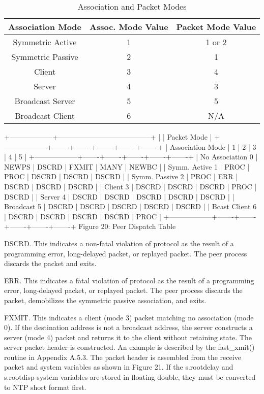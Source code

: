 \begin{table}[htb]
\center
\begin{tabular}{c | c | c}
Association Mode & Assoc. Mode Value & Packet Mode Value \\
\hline
\hline
Symmetric Active & 1 & 1 or 2 \\
Symmetric Passive & 2 & 1 \\
Client & 3 & 4 \\
Server & 4 & 3 \\
Broadcast Server & 5 & 5 \\
Broadcast Client & 6 & N/A \\
\hline
\end{tabular}
\label{association_and_packet_modes}
\caption{Association and Packet Modes}
\end{table}

+------------------+---------------------------------------+
| | Packet Mode |
+------------------+-------+-------+-------+-------+-------+
| Association Mode | 1 | 2 | 3 | 4 | 5 |
+------------------+-------+-------+-------+-------+-------+
| No Association 0 | NEWPS | DSCRD | FXMIT | MANY | NEWBC |
| Symm. Active 1 | PROC | PROC | DSCRD | DSCRD | DSCRD |
| Symm. Passive 2 | PROC | ERR | DSCRD | DSCRD | DSCRD |
| Client 3 | DSCRD | DSCRD | DSCRD | PROC | DSCRD |
| Server 4 | DSCRD | DSCRD | DSCRD | DSCRD | DSCRD |
| Broadcast 5 | DSCRD | DSCRD | DSCRD | DSCRD | DSCRD |
| Bcast Client 6 | DSCRD | DSCRD | DSCRD | DSCRD | PROC |
+------------------+-------+-------+-------+-------+-------+
Figure 20: Peer Dispatch Table

DSCRD. This indicates a non-fatal violation of protocol as the
result of a programming error, long-delayed packet, or replayed
packet. The peer process discards the packet and exits.

ERR. This indicates a fatal violation of protocol as the result of a
programming error, long-delayed packet, or replayed packet. The peer
process discards the packet, demobilizes the symmetric passive
association, and exits.

FXMIT. This indicates a client (mode 3) packet matching no
association (mode 0). If the destination address is not a broadcast
address, the server constructs a server (mode 4) packet and returns
it to the client without retaining state. The server packet header
is constructed. An example is described by the fast\_xmit() routine
in Appendix A.5.3. The packet header is assembled from the receive
packet and system variables as shown in Figure 21. If the
s.rootdelay and s.rootdisp system variables are stored in floating
double, they must be converted to NTP short format first.

